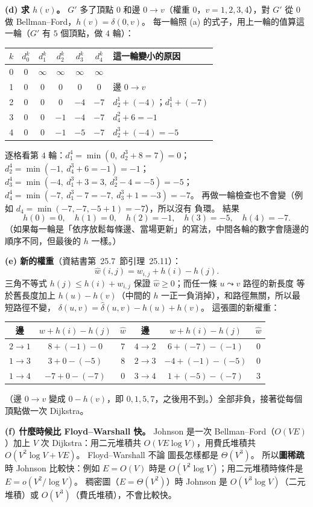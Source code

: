 \begin{pastsoln}
\textbf{(d) 求 $h(v)$。} $G'$ 多了頂點 $0$ 和邊 $0 \to v$（權重 $0$，$v = 1, 2, 3, 4$），對 $G'$
從 $0$ 做 Bellman--Ford，$h(v) = \delta(0, v)$。 每一輪照 (a) 的式子，用上一輪的值算這一輪（$G'$
有 $5$ 個頂點，做 $4$ 輪）：
\begin{center}
\begin{tabular}{ccccccl}
\toprule
$k$ & $d_0^k$ & $d_1^k$ & $d_2^k$ & $d_3^k$ & $d_4^k$ & 這一輪變小的原因 \\
\midrule
0 & 0 & $\infty$ & $\infty$ & $\infty$ & $\infty$ & \\
1 & 0 & 0 & 0 & 0 & 0 & 邊 $0 \to v$ \\
2 & 0 & 0 & 0 & $-4$ & $-7$ & $d_2^1 + (-4)$；$d_1^1 + (-7)$ \\
3 & 0 & 0 & $-1$ & $-4$ & $-7$ & $d_4^2 + 6 = -1$ \\
4 & 0 & 0 & $-1$ & $-5$ & $-7$ & $d_2^3 + (-4) = -5$ \\
\bottomrule
\end{tabular}
\end{center}
逐格看第 $4$ 輪：$d_1^4 = \min(0,\ d_2^3 + 8 = 7) = 0$；$d_2^4 = \min(-1,\ d_4^3 + 6 = -1) = -1$；
$d_3^4 = \min(-4,\ d_1^3 + 3 = 3,\ d_2^3 - 4 = -5) = -5$；$d_4^4 = \min(-7,\ d_1^3 - 7 = -7,\
d_3^3 + 1 = -3) = -7$。 再做一輪檢查也不會變（例如 $d_4 = \min(-7, -7, -5 + 1) = -7$），所以沒有
負環。 結果
\[
h(0) = 0,\quad h(1) = 0,\quad h(2) = -1,\quad h(3) = -5,\quad h(4) = -7.
\]
（如果每一輪是「依序放鬆每條邊、當場更新」的寫法，中間各輪的數字會隨邊的順序不同，但最後的
$h$ 一樣。）

\textbf{(e) 新的權重}（資結書第~25.7~節引理~25.11）：
\[
\widehat{w}(i, j) = w_{i,j} + h(i) - h(j).
\]
三角不等式 $h(j) \le h(i) + w_{i,j}$ 保證 $\widehat{w} \ge 0$；而任一條 $u \leadsto v$ 路徑的新長度
等於舊長度加上 $h(u) - h(v)$（中間的 $h$ 一正一負消掉），和路徑無關，所以最短路徑不變，
$\delta(u, v) = \widehat{\delta}(u, v) - h(u) + h(v)$。 這張圖的新權重：
\begin{center}
\begin{tabular}{ccc|ccc}
\toprule
邊 & $w + h(i) - h(j)$ & $\widehat{w}$ & 邊 & $w + h(i) - h(j)$ & $\widehat{w}$ \\
\midrule
$2 \to 1$ & $8 + (-1) - 0$ & $7$ & $4 \to 2$ & $6 + (-7) - (-1)$ & $0$ \\
$1 \to 3$ & $3 + 0 - (-5)$ & $8$ & $2 \to 3$ & $-4 + (-1) - (-5)$ & $0$ \\
$1 \to 4$ & $-7 + 0 - (-7)$ & $0$ & $3 \to 4$ & $1 + (-5) - (-7)$ & $3$ \\
\bottomrule
\end{tabular}
\end{center}
（邊 $0 \to v$ 變成 $0 - h(v)$，即 $0, 1, 5, 7$，之後用不到。）全部非負，接著從每個頂點做一次
Dijkstra。

\textbf{(f) 什麼時候比 Floyd--Warshall 快。} Johnson 是一次 Bellman--Ford（$O(VE)$）加上 $V$ 次
Dijkstra：用二元堆積共 $O(VE \log V)$，用費氏堆積共 $O(V^2 \log V + VE)$。 Floyd--Warshall 不論
圖長怎樣都是 $\Theta(V^3)$。 所以\textbf{圖稀疏}時 Johnson 比較快：例如 $E = O(V)$ 時是
$O(V^2 \log V)$；用二元堆積時條件是 $E = o(V^2 / \log V)$。 稠密圖（$E = \Theta(V^2)$）時
Johnson 是 $O(V^3 \log V)$（二元堆積）或 $O(V^3)$（費氏堆積），不會比較快。
\end{pastsoln}
